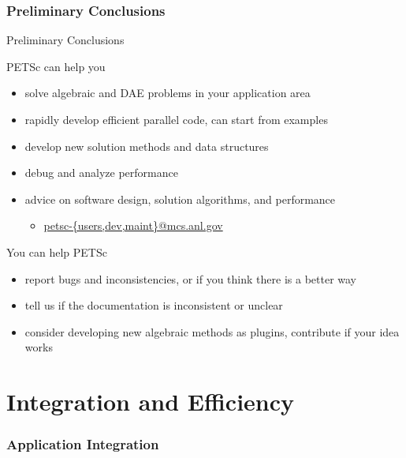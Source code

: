\documentclass{beamer}
\begin{document}
\section*{Preliminary Conclusions}
\begin{frame}{Preliminary Conclusions}
  \begin{block}{PETSc can help you}
    \begin{itemize}
    \item solve algebraic and DAE problems in your application area
    \item rapidly develop efficient parallel code, can start from examples
    \item develop new solution methods and data structures
    \item debug and analyze performance
    \item advice on software design, solution algorithms, and performance
      \begin{itemize}
      \item \url{petsc-{users,dev,maint}@mcs.anl.gov}
      \end{itemize}
    \end{itemize}
  \end{block}
  \begin{block}{You can help PETSc}
    \begin{itemize}
    \item report bugs and inconsistencies, or if you think there is a better way
    \item tell us if the documentation is inconsistent or unclear
    \item consider developing new algebraic methods as plugins, contribute if your idea works
    \end{itemize}
  \end{block}
\end{frame}


\part{Integration and Efficiency}
\section{Application Integration}







\end{document}
